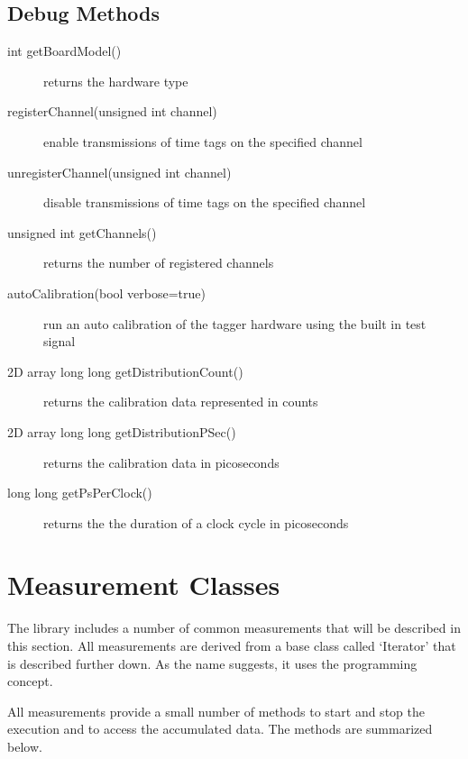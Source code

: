 \documentclass[letterpaper,10pt,english]{sphinxmanual}
\begin{document}
\subsection{Debug Methods}
\label{sections/api:debug-methods}\begin{description}
\item[{int getBoardModel()}] \leavevmode
returns the hardware type

\item[{registerChannel(unsigned int channel)}] \leavevmode
enable transmissions of time tags on the specified channel

\item[{unregisterChannel(unsigned int channel)}] \leavevmode
disable transmissions of time tags on the specified channel

\item[{unsigned int getChannels()}] \leavevmode
returns the number of registered channels

\item[{autoCalibration(bool verbose=true)}] \leavevmode
run an auto calibration of the tagger hardware using the built in test signal

\item[{2D array long long getDistributionCount()}] \leavevmode
returns the calibration data represented in counts

\item[{2D array long long getDistributionPSec()}] \leavevmode
returns the calibration data in picoseconds

\item[{long long getPsPerClock()}] \leavevmode
returns the the duration of a clock cycle in picoseconds

\end{description}


\section{Measurement Classes}
\label{sections/api:measurement-classes}
The library includes a number of common measurements that will be described in this section.
All measurements are derived from a base class called `Iterator' that is described further down.
As the name suggests, it uses the  programming concept.

All measurements provide a small number of methods to start and stop the execution
and to access the accumulated data. The methods are summarized below.
\end{document}
